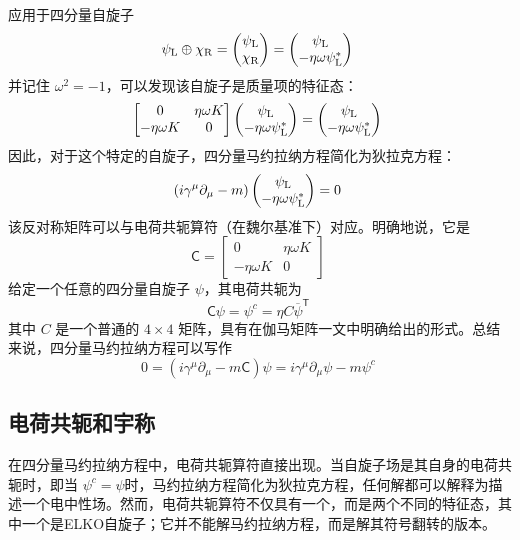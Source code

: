应用于四分量自旋子
\[
\psi_{\rm{L}} \oplus \chi_{\rm{R}} = \begin{pmatrix} \psi_{\rm{L}} \\ \chi_{\rm{R}} \end{pmatrix} = \begin{pmatrix} \psi_{\rm{L}} \\ -\eta \omega \psi_{\rm{L}}^{*} \end{pmatrix}~
\]
并记住 \( \omega^2 = -1 \)，可以发现该自旋子是质量项的特征态：
\[
\begin{bmatrix} 0 & \eta \omega K \\ -\eta \omega K & 0 \end{bmatrix} \begin{pmatrix} \psi_{\rm{L}} \\ -\eta \omega \psi_{\rm{L}}^{*} \end{pmatrix} = \begin{pmatrix} \psi_{\rm{L}} \\ -\eta \omega \psi_{\rm{L}}^{*} \end{pmatrix}~
\]
因此，对于这个特定的自旋子，四分量马约拉纳方程简化为狄拉克方程：
\[
\left(i \gamma^{\mu} \partial_{\mu} - m \right) \begin{pmatrix} \psi_{\rm{L}} \\ -\eta \omega \psi_{\rm{L}}^{*} \end{pmatrix} = 0~
\]
该反对称矩阵可以与电荷共轭算符（在魏尔基准下）对应。明确地说，它是
\[
\mathsf{C} = \begin{bmatrix} 0 & \eta \omega K \\ -\eta \omega K & 0 \end{bmatrix}~
\]
给定一个任意的四分量自旋子 \(\psi\)，其电荷共轭为
\[
\mathsf{C} \psi = \psi^{c} = \eta C {\overline{\psi}}^{\textsf{T}}~
\]
其中 \(C\) 是一个普通的 \(4 \times 4\) 矩阵，具有在伽马矩阵一文中明确给出的形式。总结来说，四分量马约拉纳方程可以写作
\[
0 = \left(i \gamma^{\mu} \partial_{\mu} - m \mathsf{C} \right) \psi = i \gamma^{\mu} \partial_{\mu} \psi - m \psi^{c}~
\]
\subsection{电荷共轭和宇称}  
在四分量马约拉纳方程中，电荷共轭算符直接出现。当自旋子场是其自身的电荷共轭时，即当
\(\psi^{c} = \psi\)时，马约拉纳方程简化为狄拉克方程，任何解都可以解释为描述一个电中性场。然而，电荷共轭算符不仅具有一个，而是两个不同的特征态，其中一个是ELKO自旋子；它并不能解马约拉纳方程，而是解其符号翻转的版本。


